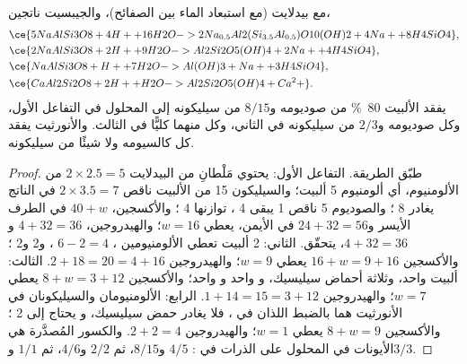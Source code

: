 \begin{proposition}\label{prop:b1:weathering-clays:feldspars}
مع  بيدلايت 
(مع استبعاد الماء بين الصفائح)،   والجيبسيت
 ناتجين،
\begin{align*}
&\ce{5 NaAlSi3O8 + 4 H+ + 16 H2O -> 2 Na_{0.5}Al2(Si_{3.5}Al_{0.5})O10(OH)2 + 4 Na+ + 8 H4SiO4},\\ %
&\ce{2 NaAlSi3O8 + 2 H+ + 9 H2O -> Al2Si2O5(OH)4 + 2 Na+ + 4 H4SiO4},\\
&\ce{NaAlSi3O8 + H+ + 7 H2O -> Al(OH)3 + Na+ + 3 H4SiO4},\\
&\ce{CaAl2Si2O8 + 2 H+ + H2O -> Al2Si2O5(OH)4 + Ca^2+}.
\end{align*}
يفقد الألبيت \qty{80}{\percent} من صوديومه و$8/15$ من سيليكونه إلى المحلول في التفاعل الأول، وكل صوديومه و$2/3$ من سيليكونه في الثاني، وكل منهما كليًّا في الثالث. والأنورثيت يفقد كل كالسيومه ولا شيئًا من سيليكونه.
\end{proposition}

\begin{proof}
طبّق الطريقة. التفاعل الأول: يحتوي مَلْطانِ من البيدلايت $2\times2.5 = 5$ من الألومنيوم، أي ألومنيوم 5 ألبيت؛ والسيليكون 15 من الألبيت ناقص $2\times3.5 = 7$ في الناتج يغادر 8 ؛ والصوديوم 5 ناقص 1 يبقى 4 ، توازنها 4 ؛ والأكسجين، $40 + w$ في الطرف الأيسر و$24 + 32 =
56$ في الأيمن، يعطي $w = 16$؛ والهيدروجين، $4 + 32 = 36$ و$4 + 32 = 36$، يتحقّق. الثاني: 2 ألبيت تعطي الألومنيومين ، $6 - 2 = 4$ ، و\num{2}  و\num{2} ؛ والأكسجين $16 + w = 9 + 16$ يعطي $w = 9$؛ والهيدروجين $2 + 18 = 20 = 4 + 16$. الثالث: ألبيت واحد، وثلاثة أحماض سيليسيك، و واحد و واحد؛ والأكسجين $8 + w = 3 + 12$ يعطي $w = 7$؛ والهيدروجين $1 + 14 = 15 = 3 + 12$. الرابع: الألومنيومان والسيليكونان في الأنورثيت هما بالضبط اللذان في ، فلا يغادر حمض سيليسيك، و يحتاج إلى 2 ؛ والأكسجين $8 + w = 9$ يعطي $w = 1$؛ والهيدروجين $2 + 2 = 4$. والكسور المُصدَّرة هي الأيونات في المحلول على الذرات في : $4/5$ و$8/15$، ثم $2/2$ و$4/6$، ثم $1/1$ و$3/3$.
\end{proof}

